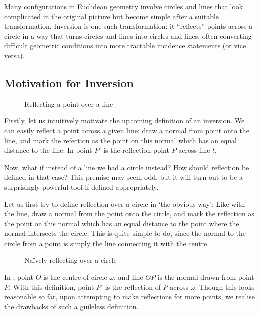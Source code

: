 \documentclass[a4paper, 12pt]{article}
\theoremstyle{definition}
\begin{document}
\vspace{-0.5em}\noindent Many configurations in Euclidean geometry involve circles and lines that look complicated in the original picture but become simple after a suitable transformation. Inversion is one such transformation: it ``reflects'' points across a circle in a way that turns circles and lines into circles and lines, often converting difficult geometric conditions into more tractable incidence statements (or vice versa).

\subsection{Motivation for Inversion}\label{sec:motivation}
\begin{figure}[H]
  \begin{center}
    
  \end{center}
  \caption{Reflecting a point over a line}
  \label{fig:1}
\end{figure}

Firstly, let us intuitively motivate the upcoming definition of an inversion.
We can easily reflect a point across a given line: draw a normal from point onto the line,
and mark the refection as the point on this normal which has an equal distance to the line.
In  point $P'$ is the reflection point $P$ across line $l$.

Now, what if instead of a line we had a circle instead?
How should reflection be defined in that case?
This premise may seem odd, but it will turn out to be a surprisingly powerful tool if defined
appropriately.

Let us first try to define reflection over a circle in `the obvious way':
Like with the line, draw a normal from the point onto the circle, and mark the reflection as
the point on this normal which has an equal distance to the point where the normal intersects
the circle.
This is quite simple to do, since the normal to the circle from a point is simply the 
line connecting it with the centre.

\begin{figure}[H]
  \begin{center}
    
  \end{center}
  \caption{Naïvely reflecting over a circle}
  \label{fig:2}
\end{figure}

\vspace{-1em} In , point $O$ is the centre of circle $\omega$, and line $OP$ is the normal drawn from point $P$.
With this definition, point $P'$ is the reflection of $P$ across $\omega$.
Though this looks reasonable so far, upon attempting to make reflections for
more points, we realise the drawbacks of such a guileless definition.
\end{document}
